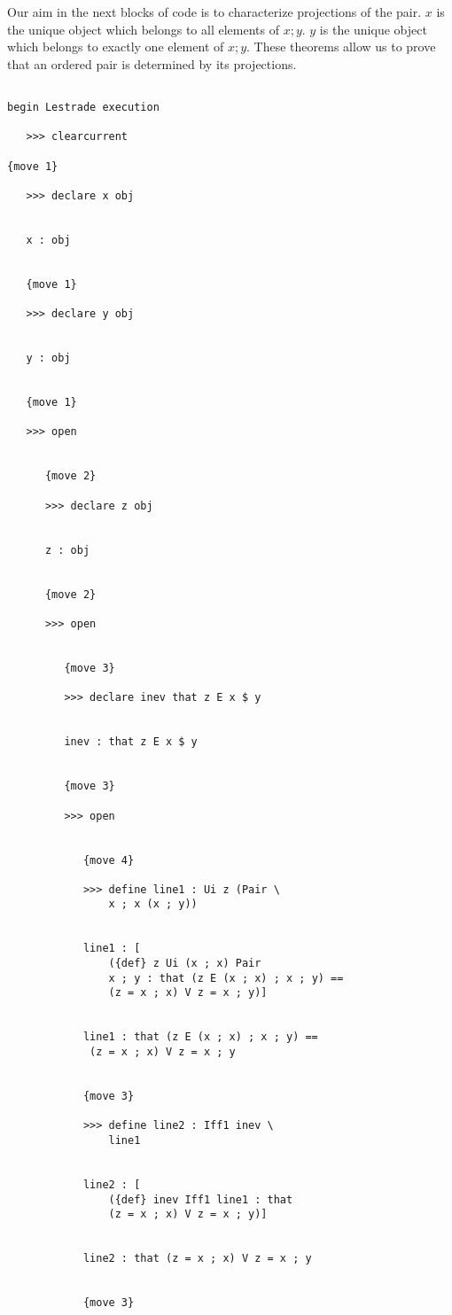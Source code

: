 \documentclass[12pt]{article}
\begin{document}
Our aim in the next blocks of code is to characterize projections of the pair.  $x$ is the unique object which belongs to all elements of $x;y$.  $y$ is the unique object which belongs to exactly one element of $x;y$.  These theorems allow us to prove that an ordered pair is determined by its projections.

\begin{verbatim}

begin Lestrade execution

   >>> clearcurrent

{move 1}

   >>> declare x obj


   x : obj


   {move 1}

   >>> declare y obj


   y : obj


   {move 1}

   >>> open


      {move 2}

      >>> declare z obj


      z : obj


      {move 2}

      >>> open


         {move 3}

         >>> declare inev that z E x $ y


         inev : that z E x $ y


         {move 3}

         >>> open


            {move 4}

            >>> define line1 : Ui z (Pair \
                x ; x (x ; y))


            line1 : [
                ({def} z Ui (x ; x) Pair 
                x ; y : that (z E (x ; x) ; x ; y) == 
                (z = x ; x) V z = x ; y)]


            line1 : that (z E (x ; x) ; x ; y) == 
             (z = x ; x) V z = x ; y


            {move 3}

            >>> define line2 : Iff1 inev \
                line1


            line2 : [
                ({def} inev Iff1 line1 : that 
                (z = x ; x) V z = x ; y)]


            line2 : that (z = x ; x) V z = x ; y


            {move 3}


\end{verbatim}
\end{document}
